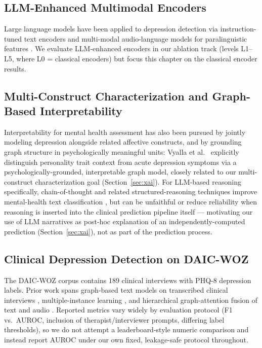 \documentclass[12pt,oneside]{book}
\begin{document}
\subsection{LLM-Enhanced Multimodal Encoders}

Large language models have been applied to depression detection via instruction-tuned text encoders and multi-modal audio-language models for paralinguistic features \citep{zhao2025multimodalllm}. We evaluate LLM-enhanced encoders in our ablation track (levels L1--L5, where L0 = classical encoders) but focus this chapter on the classical encoder results.

\subsection{Multi-Construct Characterization and Graph-Based Interpretability}

Interpretability for mental health assessment has also been pursued by jointly modeling depression alongside related affective constructs, and by grounding graph structure in psychologically meaningful units: Vyalla et al.\ \citep{vyalla2026psygat} explicitly distinguish personality trait context from acute depression symptoms via a psychologically-grounded, interpretable graph model, closely related to our multi-construct characterization goal (Section~\ref{sec:xai}). For LLM-based reasoning specifically, chain-of-thought and related structured-reasoning techniques improve mental-health text classification \citep{patil2025cognitivemental}, but can be unfaithful or reduce reliability when reasoning is inserted into the clinical prediction pipeline itself \citep{wu2025cotfails} — motivating our use of LLM narratives as post-hoc explanation of an independently-computed prediction (Section~\ref{sec:xai}), not as part of the prediction process.

\subsection{Clinical Depression Detection on DAIC-WOZ}

The DAIC-WOZ corpus \citep{gratch2014distress} contains 189 clinical interviews with PHQ-8 depression labels. Prior work spans graph-based text models on transcribed clinical interviews \citep{burdisso2024gcndp}, multiple-instance learning \citep{zhang2025mil}, and hierarchical graph-attention fusion of text and audio \citep{niu2021multimodal}. Reported metrics vary widely by evaluation protocol (F1 vs.\ AUROC, inclusion of therapist/interviewer prompts, differing label thresholds), so we do not attempt a leaderboard-style numeric comparison and instead report AUROC under our own fixed, leakage-safe protocol throughout.
\end{document}
